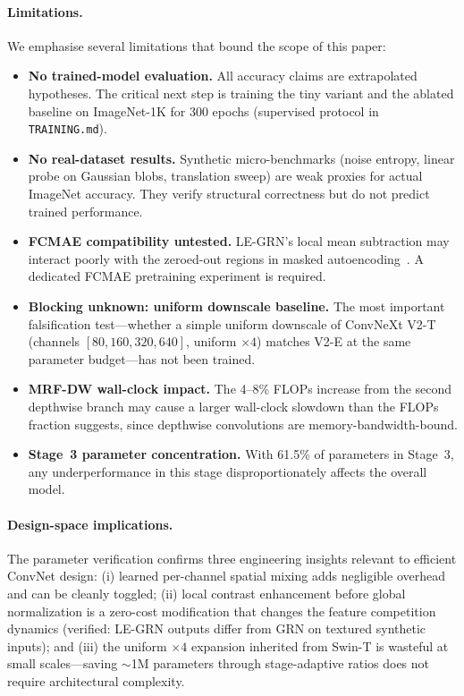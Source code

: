 \documentclass{article}
\begin{document}
\paragraph{Limitations.}
We emphasise several limitations that bound the scope of this paper:
\begin{itemize}
  \item \textbf{No trained-model evaluation.}  All accuracy claims are
        extrapolated hypotheses.  The critical next step is training
        the tiny variant and the ablated baseline on ImageNet-1K for
        300 epochs (supervised protocol in
        \texttt{TRAINING.md}).
  \item \textbf{No real-dataset results.}  Synthetic micro-benchmarks
        (noise entropy, linear probe on Gaussian blobs, translation
        sweep) are weak proxies for actual ImageNet accuracy.  They
        verify structural correctness but do not predict trained
        performance.
  \item \textbf{FCMAE compatibility untested.}  LE-GRN's local mean
        subtraction may interact poorly with the zeroed-out regions
        in masked autoencoding~\cite{he2022mae}.  A dedicated FCMAE
        pretraining experiment is required.
  \item \textbf{Blocking unknown: uniform downscale baseline.}  The
        most important falsification test---whether a simple uniform
        downscale of ConvNeXt V2-T (channels $[80,160,320,640]$,
        uniform $\times4$) matches V2-E at the same parameter
        budget---has not been trained.
  \item \textbf{MRF-DW wall-clock impact.}  The 4--8\% FLOPs increase
        from the second depthwise branch may cause a larger wall-clock
        slowdown than the FLOPs fraction suggests, since depthwise
        convolutions are memory-bandwidth-bound.
  \item \textbf{Stage~3 parameter concentration.}  With 61.5\% of
        parameters in Stage~3, any underperformance in this stage
        disproportionately affects the overall model.
\end{itemize}

\paragraph{Design-space implications.}
The parameter verification confirms three engineering insights relevant
to efficient ConvNet design: (i) learned per-channel spatial mixing
adds negligible overhead and can be cleanly toggled; (ii) local
contrast enhancement before global normalization is a zero-cost
modification that changes the feature competition dynamics (verified:
LE-GRN outputs differ from GRN on textured synthetic inputs); and
(iii) the uniform $\times4$ expansion inherited from Swin-T is wasteful
at small scales---saving $\sim$1M parameters through stage-adaptive
ratios does not require architectural complexity.
\end{document}
